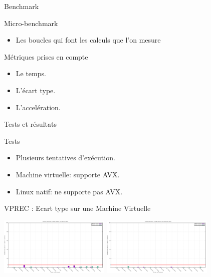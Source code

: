 \documentclass{beamer}
\begin{document}
\begin{frame}{Benchmark}

  \begin{block}{Micro-benchmark}
    \begin{itemize}
    \item Les boucles qui font les calculs que l'on mesure 
    \end{itemize}
  \end{block}

  \begin{block}{Métriques prises en compte}
    \begin{itemize}
      
    \item Le temps.
    \item L'écart type.
    \item L'accelération.
      
    \end{itemize}
  \end{block}
  
\end{frame}

\begin{frame}{Tests et résultats}

  \begin{block}{Tests}
    
    \begin{itemize}

    \item Plusieurs tentatives d'exécution.
    \item Machine virtuelle: supporte AVX.
    \item Linux natif: ne supporte pas AVX.
      
      
    \end{itemize}
  \end{block}

\end{frame}

\begin{frame}{VPREC : Ecart type sur une Machine Virtuelle}
  
  \centering\includegraphics[width=200px]{../ressources/vm_vprec_normal_stddev.png}
  \centering\includegraphics[width=200px]{../ressources/vm_vprec_denormal_stddev.png}
  
\end{frame}
\end{document}

